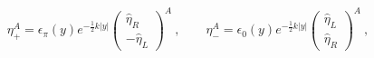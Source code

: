 \begin{equation} \label{solutkillingspinflip}
       \eta_+^A=\epsilon_\pi(y)e^{-\frac{1}{2}k|y|}\left(\begin{array}{c}\hat{\eta}_R\\-\hat{\eta}_L\end{array}\right)^A\ ,\qquad \eta_-^A=\epsilon_0(y)e^{-\frac{1}{2}k|y|}\left(\begin{array}{c}\hat{\eta}_L\\\hat{\eta}_R\end{array}\right)^A\ ,
       \end{equation} 
